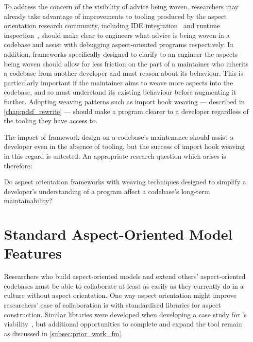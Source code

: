 To address the concern of the visibility of advice being woven, researchers may
already take advantage of improvements to tooling produced by the aspect
orientation research community, including IDE
integration~\cite{clement2003eclipseAJDT} and runtime
inspection~\cite{mehner2002towards}, should make clear to engineers what advice
is being woven in a codebase and assist with debugging aspect-oriented programs
respectively. In addition, \aspectorientation{} frameworks specifically designed
to clarify to an engineer the aspects being woven should allow for less friction
on the part of a maintainer who inherits a codebase from another developer and
must reason about its behaviour. This is particularly important if the
maintainer aims to weave more aspects into the codebase, and so must understand
its existing behaviour before augmenting it further. Adopting weaving patterns
such as import hook weaving --- described in \cref{chap:pdsf_rewrite} --- should
make a program clearer to a developer regardless of the tooling they have access
to.

The impact of framework design on a codebase's maintenance should assist a
developer even in the absence of tooling, but the success of import hook weaving
in this regard is untested. An appropriate research question which arises is
therefore:

\begin{researchquestion}
Do aspect orientation frameworks with weaving techniques designed to simplify a
developer's understanding of a program affect a codebase's long-term
maintainability?
\end{researchquestion}


\section{Standard Aspect-Oriented Model Features}
\label{standard_aosm_model_features}
\label{future_work_revive_fuzzimoss}

Researchers who build aspect-oriented models and extend others' aspect-oriented
codebases must be able to collaborate at least as easily as they currently do in
a culture without aspect orientation. One way aspect orientation might improve
researchers' ease of collaboration is with standardised libraries for aspect
construction. Similar libraries were developed when developing a case study for
\pdsfthree{}'s viability~\cite{wallis2018caise,fuzzimoss_repo}, but additional
opportunities to complete and expand the tool remain as discussed in
\cref{subsec:prior_work_fm}.

